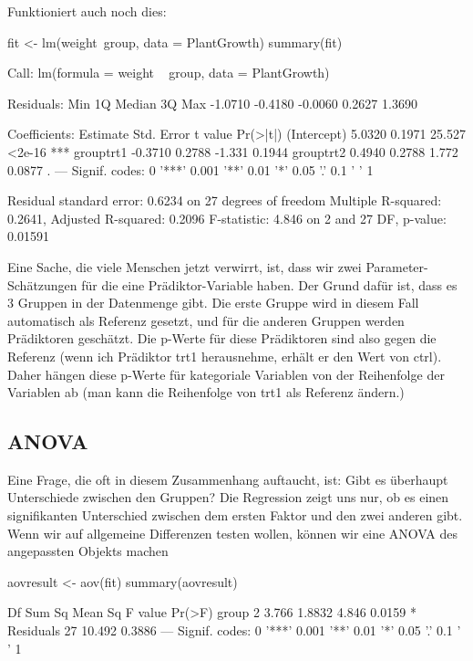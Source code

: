 \documentclass[a4paper,twoside]{tufte-book}\usepackage[]{graphicx}\usepackage[]{color}
\begin{document}
\begin{appendices}
Funktioniert auch noch dies:

\begin{Schunk}
\begin{Sinput}
fit <- lm(weight~group, data = PlantGrowth)
summary(fit)
\end{Sinput}
\begin{Soutput}

Call:
lm(formula = weight ~ group, data = PlantGrowth)

Residuals:
    Min      1Q  Median      3Q     Max 
-1.0710 -0.4180 -0.0060  0.2627  1.3690 

Coefficients:
            Estimate Std. Error t value Pr(>|t|)    
(Intercept)   5.0320     0.1971  25.527   <2e-16 ***
grouptrt1    -0.3710     0.2788  -1.331   0.1944    
grouptrt2     0.4940     0.2788   1.772   0.0877 .  
---
Signif. codes:  0 '***' 0.001 '**' 0.01 '*' 0.05 '.' 0.1 ' ' 1

Residual standard error: 0.6234 on 27 degrees of freedom
Multiple R-squared:  0.2641,	Adjusted R-squared:  0.2096 
F-statistic: 4.846 on 2 and 27 DF,  p-value: 0.01591
\end{Soutput}
\end{Schunk}

Eine Sache, die viele Menschen jetzt verwirrt, ist, dass wir zwei Parameter-Schätzungen für die eine Prädiktor-Variable haben. Der Grund dafür ist, dass es 3 Gruppen in der Datenmenge gibt. Die erste Gruppe wird in diesem Fall automatisch als Referenz gesetzt, und für die anderen Gruppen werden Prädiktoren geschätzt. Die p-Werte für diese Prädiktoren sind also gegen die Referenz (wenn ich Prädiktor trt1 herausnehme, erhält er den Wert von ctrl). Daher hängen diese p-Werte für kategoriale Variablen von der Reihenfolge der Variablen ab (man kann die Reihenfolge von trt1 als Referenz ändern.)


\subsection{ANOVA}

Eine Frage, die oft in diesem Zusammenhang auftaucht, ist: Gibt es überhaupt Unterschiede zwischen den Gruppen? Die Regression zeigt uns nur, ob es einen signifikanten Unterschied zwischen dem ersten Faktor und den zwei anderen gibt. Wenn wir auf allgemeine Differenzen testen wollen, können wir eine ANOVA des angepassten Objekts machen

\begin{Schunk}
\begin{Sinput}
aovresult <- aov(fit)
summary(aovresult)
\end{Sinput}
\begin{Soutput}
            Df Sum Sq Mean Sq F value Pr(>F)  
group        2  3.766  1.8832   4.846 0.0159 *
Residuals   27 10.492  0.3886                 
---
Signif. codes:  0 '***' 0.001 '**' 0.01 '*' 0.05 '.' 0.1 ' ' 1
\end{Soutput}
\end{Schunk}


\end{appendices}
\end{document}
